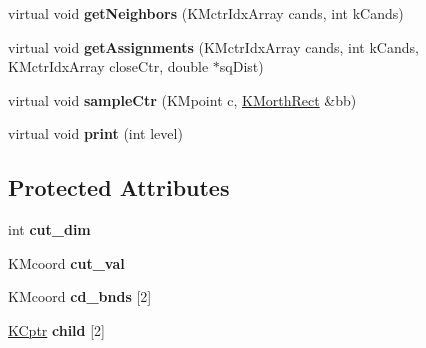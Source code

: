 \begin{DoxyCompactItemize}
\item 
\hypertarget{class_k_csplit_aaf3c546bc0da6f16d531a943c6ead24f}{
virtual void {\bfseries getNeighbors} (KMctrIdxArray cands, int kCands)}
\label{class_k_csplit_aaf3c546bc0da6f16d531a943c6ead24f}

\item 
\hypertarget{class_k_csplit_ad2f624ffa40deb3d3da99586901b9711}{
virtual void {\bfseries getAssignments} (KMctrIdxArray cands, int kCands, KMctrIdxArray closeCtr, double $\ast$sqDist)}
\label{class_k_csplit_ad2f624ffa40deb3d3da99586901b9711}

\item 
\hypertarget{class_k_csplit_a20b7de7bce1ad33c531ea5b35207ffb5}{
virtual void {\bfseries sampleCtr} (KMpoint c, \hyperlink{class_k_morth_rect}{KMorthRect} \&bb)}
\label{class_k_csplit_a20b7de7bce1ad33c531ea5b35207ffb5}

\item 
\hypertarget{class_k_csplit_a5730072a7cff887a8954a8bdaaea4eb2}{
virtual void {\bfseries print} (int level)}
\label{class_k_csplit_a5730072a7cff887a8954a8bdaaea4eb2}

\end{DoxyCompactItemize}
\subsection*{Protected Attributes}
\begin{DoxyCompactItemize}
\item 
\hypertarget{class_k_csplit_a3fafa5ad0c3085d38640cba423a2f78e}{
int {\bfseries cut\_\-dim}}
\label{class_k_csplit_a3fafa5ad0c3085d38640cba423a2f78e}

\item 
\hypertarget{class_k_csplit_a0abdf6968fd44667aa2bf7cf96a8894e}{
KMcoord {\bfseries cut\_\-val}}
\label{class_k_csplit_a0abdf6968fd44667aa2bf7cf96a8894e}

\item 
\hypertarget{class_k_csplit_a6f264b083ea44a444867bd69fe16919f}{
KMcoord {\bfseries cd\_\-bnds} \mbox{[}2\mbox{]}}
\label{class_k_csplit_a6f264b083ea44a444867bd69fe16919f}

\item 
\hypertarget{class_k_csplit_a390ab064eb0995db8dbfeba0aada1c82}{
\hyperlink{class_k_cnode}{KCptr} {\bfseries child} \mbox{[}2\mbox{]}}
\label{class_k_csplit_a390ab064eb0995db8dbfeba0aada1c82}

\end{DoxyCompactItemize}


